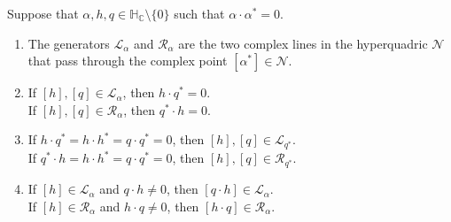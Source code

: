\documentclass[11pt]{article}
\newenvironment{claims}{\begin{enumerate}[topsep=0pt,itemsep=0pt,leftmargin=8mm,label=\textnormal{\textbf{(\alph*)}},ref=(\alph*)]}{\end{enumerate}}
\newcommand{\C}{\mathbb{C}}
\newcommand{\cN}{\mathcal{N}}
\newcommand{\cL}{\mathcal{L}}
\newcommand{\cR}{\mathcal{R}}
\newcommand{\HC}{\mathbb{H}_{\C}}
\begin{document}
\begin{lemma}
\label{lem:N}
Suppose that $\alpha,h,q\in\HC\setminus\{0\}$ such that $\alpha\cdot\alpha^*=0$.
\begin{claims}
\item\label{lem:N:a}
The generators $\cL_\alpha$ and $\cR_\alpha$ are the two complex lines in the hyperquadric $\cN$
that pass through the complex point $[\alpha^*]\in\cN$.

\item\label{lem:N:b}
If $[h],[q]\in \cL_\alpha$, then $h\cdot q^*=0$.\\
If $[h],[q]\in \cR_\alpha$, then $q^*\cdot h=0$.

\item\label{lem:N:c}
If $h\cdot q^*=h\cdot h^*=q\cdot q^*=0$, then $[h],[q]\in \cL_{q^*}$.\\
If $q^*\cdot h=h\cdot h^*=q\cdot q^*=0$, then $[h],[q]\in \cR_{q^*}$.


\item\label{lem:N:d}
If $[h]\in\cL_\alpha$ and $q\cdot h\neq 0$, then $[q\cdot h]\in \cL_\alpha$.\\
If $[h]\in\cR_\alpha$ and $h\cdot q\neq 0$, then $[h\cdot q]\in \cR_\alpha$.
\end{claims}
\end{lemma}
\end{document}
